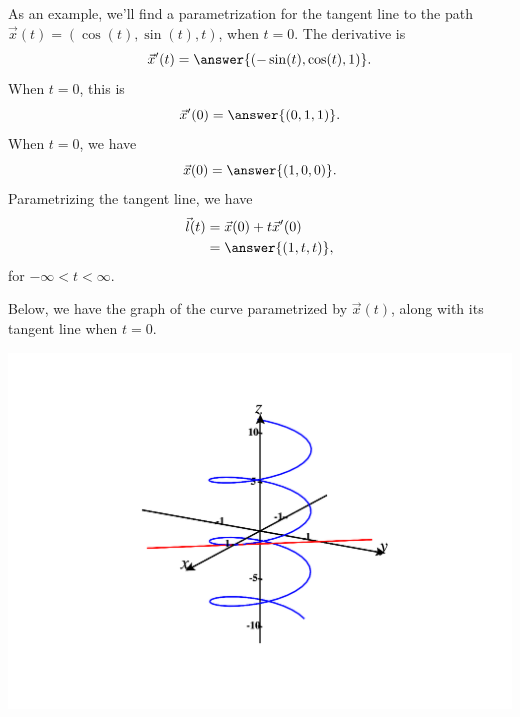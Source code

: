 \documentclass{ximera}
\begin{document}
\begin{example}
As an example, we'll find a parametrization for the tangent line to the path $\vec{x}(t)=(\cos(t),\sin(t),t)$, when $t=0$. The derivative is
\[
\vec{x}'(t) = \answer{(-\sin(t),\cos(t),1)}.
\]
When $t=0$, this is
\[
\vec{x}'(0) = \answer{(0,1,1)}.
\]
When $t=0$, we have
\[
\vec{x}(0) = \answer{(1,0,0)}.
\]
Parametrizing the tangent line, we have
\begin{align*}
\vec{l}(t) &= \vec{x}(0) + t\vec{x}'(0)\\
&= \answer{(1,t,t)},
\end{align*}
for $-\infty < t < \infty$.

Below, we have the graph of the curve parametrized by $\vec{x}(t)$, along with its tangent line when $t=0$.

\begin{image}
\includegraphics[width=\textwidth]{CalcPlot3D-tangent_line}
\end{image}
\end{example}
\end{document}
